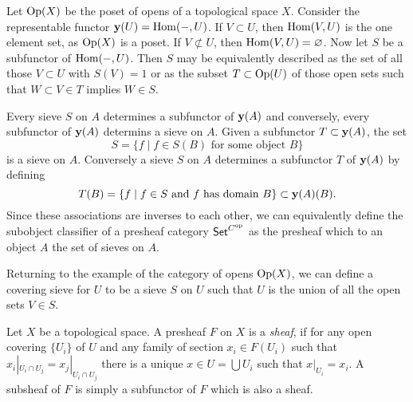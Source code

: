 %
%
\begin{example}
	Let $\operatorname{Op}(X)$ be the poset of opens of a topological space $X$. Consider the representable functor $\mathbf{y}(U) = \operatorname{Hom}(-,U)$. If $V \subset U$, then $\operatorname{Hom}(V,U)$ is the one element set, as $\operatorname{Op}(X)$ is a poset. If $V \not\subset U$, then $\operatorname{Hom}(V,U) = \varnothing$. Now let $S$ be a subfunctor of $\operatorname{Hom}(-,U)$. Then $S$ may be equivalently described as the set of all those $V \subset U$ with $S(V) = 1$ or as the subset $T \subset \operatorname{Op}(U)$ of those open sets such that $W \subset V \in T$ implies $W \in S$.
\end{example}

Every sieve $S$ on $A$ determines a subfunctor of $\mathbf{y}(A)$ and conversely, every subfunctor of $\mathbf{y}(A)$ determins a sieve on $A$. Given a subfunctor $T \subset \mathbf{y}(A)$, the set
\[
	S = \{f \mid f \in S(B) \text{ for some object } B\}
\]
is a sieve on $A$. Conversely a sieve $S$ on $A$ determines a subfunctor $T$  of $\mathbf{y}(A)$ by defining
\[
	T(B) = \{ f \mid f \in S \text{ and } f \text{ has domain } B\} \subset \mathbf{y}(A)(B).
\]
Since these associations are inverses to each other, we can equivalently define the subobject classifier of a presheaf category $\mathsf{Set}^{C^{\text{op}}}$ as the presheaf which to an object $A$ the set of sieves on $A$.

\begin{remark}
	Returning to the example of the category of opens $\operatorname{Op}(X)$, we can define a covering sieve for $U$ to be a sieve $S$ on $U$ such that $U$ is the union of all the open sets $V \in S$.
\end{remark}

\begin{definition}\label{def:sheaves}
	Let $X$ be a topological space. A presheaf $F$ on $X$ is a \textit{sheaf}, if for any open covering $\{U_i\}$ of $U$ and any family of section $x_i \in F(U_i)$ such that $x_i|_{U_i \cap U_j} = x_j|_{U_i \cap U_j}$ there is a unique $x \in U = \bigcup U_i$ such that $x|_{U_i} = x_i$. A subsheaf of $F$ is simply a subfunctor of $F$ which is also a sheaf.
\end{definition}

